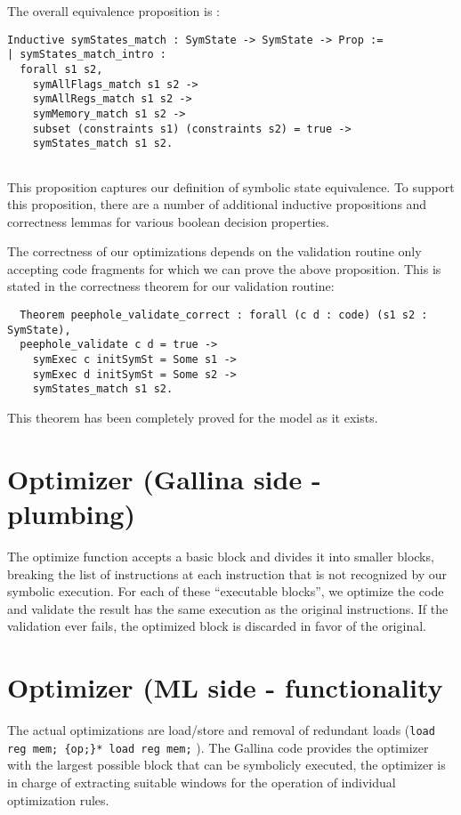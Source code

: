 \documentclass{article}
\begin{document}
The overall equivalence proposition is :

\begin{verbatim}
Inductive symStates_match : SymState -> SymState -> Prop :=
| symStates_match_intro : 
  forall s1 s2, 
    symAllFlags_match s1 s2 ->
    symAllRegs_match s1 s2 ->
    symMemory_match s1 s2 ->
    subset (constraints s1) (constraints s2) = true ->
    symStates_match s1 s2. 
  
\end{verbatim}

This proposition captures our definition of symbolic state
equivalence. To support this proposition, there are a number of
additional inductive propositions and correctness lemmas for various
boolean decision properties. 

The correctness of our optimizations depends on the validation routine
only accepting code fragments for which we can prove the above
proposition. This is stated in  the correctness theorem for our
validation routine:

\begin{verbatim}
  Theorem peephole_validate_correct : forall (c d : code) (s1 s2 : SymState),
  peephole_validate c d = true -> 
    symExec c initSymSt = Some s1 -> 
    symExec d initSymSt = Some s2 ->
    symStates_match s1 s2.
\end{verbatim}

This theorem has been completely proved for the model as it
exists.

\section{Optimizer (Gallina side - plumbing)}
The optimize function accepts a basic block and divides it into
smaller blocks, breaking the list of instructions at each instruction
that is not recognized by our symbolic execution.  For each of these
``executable blocks'', we optimize the code and validate the result
has the same execution as the original instructions.  If the
validation ever fails, the optimized block is discarded in favor of
the original.

\section{Optimizer (ML side - functionality}
The actual optimizations are load/store and removal of redundant loads
({\tt load reg mem; \{op;\}* load reg mem;} ).  The Gallina code provides the optimizer with the
largest possible block that can be symbolicly executed, the optimizer
is in charge of extracting suitable windows for the operation of
individual optimization rules.
\end{document}
